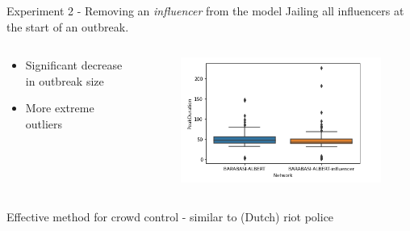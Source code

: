 \documentclass[10pt]{beamer}
\begin{document}
    \begin{frame}{Experiment 2 - Removing an \textit{influencer} from the model}
        Jailing all influencers at the start of an outbreak.
        \begin{columns}
            \begin{column}{0.3\textwidth}
                \begin{itemize}
                    \item Significant decrease in outbreak size
                    \item More extreme outliers
                \end{itemize}
            \end{column}
            \begin{column}{0.7\textwidth}
                \begin{figure}
                    \centering
                    \includegraphics[scale=0.5]{pictures/network_comparison/influencer_removal_duration.jpg}
                \end{figure}

            \end{column}
        \end{columns}
        Effective method for crowd control - similar to (Dutch) riot police
    \end{frame}
\end{document}
